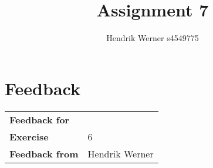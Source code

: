 \documentclass[12pt, a4paper]{article}
\title{Assignment 7}
\author{Hendrik Werner s4549775}
\begin{document}
\maketitle

\clearpage
\section*{Feedback}
\begin{tabular}{l l}
	\textbf{Feedback for} & \\
	\textbf{Exercise} & 6\\
	\textbf{Feedback from} & Hendrik Werner\\
\end{tabular}
\end{document}
